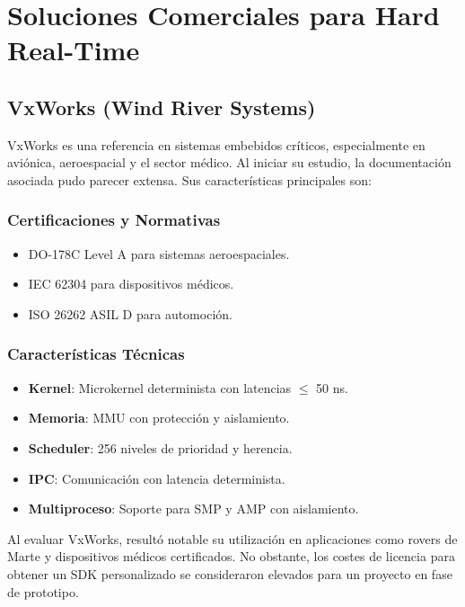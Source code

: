 \newpage
\section{Soluciones Comerciales para Hard Real-Time}

    \subsection{VxWorks (Wind River Systems)}
        VxWorks es una referencia en sistemas embebidos críticos, especialmente en aviónica, aeroespacial y el sector médico. Al iniciar su estudio, la documentación asociada pudo parecer extensa. Sus características principales son:

        \subsubsection{Certificaciones y Normativas}
            \begin{itemize}
                \item DO-178C Level A para sistemas aeroespaciales.
                \item IEC 62304 para dispositivos médicos.
                \item ISO 26262 ASIL D para automoción.
            \end{itemize}
        \subsubsection{Características Técnicas}
            \begin{itemize}
                \item \textbf{Kernel}: Microkernel determinista con latencias $\le$ 50 ns.
                \item \textbf{Memoria}: MMU con protección y aislamiento.
                \item \textbf{Scheduler}: 256 niveles de prioridad y herencia.
                \item \textbf{IPC}: Comunicación con latencia determinista.
                \item \textbf{Multiproceso}: Soporte para SMP y AMP con aislamiento.
            \end{itemize}

        Al evaluar VxWorks, resultó notable su utilización en aplicaciones como rovers de Marte y dispositivos médicos certificados. No obstante, los costes de licencia para obtener un SDK personalizado se consideraron elevados para un proyecto en fase de prototipo.

